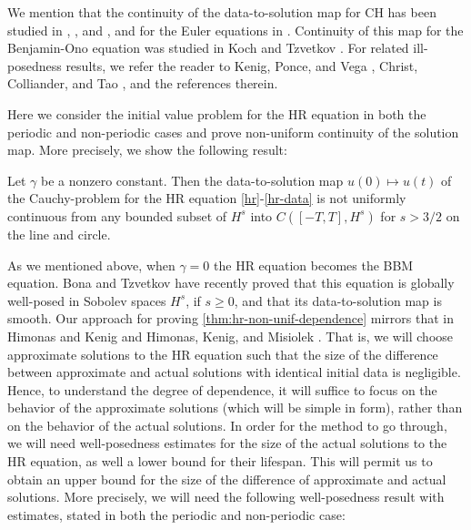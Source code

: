 We mention that the continuity of the data-to-solution map  for CH has 
been studied in  \cite{Himonas_2007_Non-uniform-con},
\cite{Himonas_2001_The-Cauchy-prob}, and 
\cite{Himonas:2005kx}, and for the Euler equations in 
\cite{Himonas_2009_Non-uniform-dep-euler}. Continuity of this map for  
the  Benjamin-Ono equation was studied in  Koch and  Tzvetkov 
\cite{Koch_2005_Nonlinear-wave-}. For related ill-posedness results, we 
refer the reader to Kenig, Ponce, and  Vega 
\cite{Kenig_2001_On-the-ill-pose}, Christ, Colliander, and Tao 
\cite{Christ_2003_Asymptotics-fre}, and the references 
therein.

Here we consider the initial value problem for the HR equation
in both the periodic and non-periodic cases
and prove non-uniform  continuity of the solution map. 
More precisely, we show the following result:
%
%
%
%
%
%
\begin{theorem}
\label{thm:hr-non-unif-dependence}
Let $\gamma$ be a nonzero constant. Then 
the data-to-solution map $u(0) \mapsto u(t)$ of the Cauchy-problem
for the HR equation
\eqref{hr}-\eqref{hr-data}
is not uniformly continuous
from any bounded subset of  $H^s$ into $C([-T, T], H^s)$
for $s>3/2$ on the line and circle.
%
\end{theorem}
%
%
%
As we mentioned above, when  $\gamma=0$ the HR equation
becomes the BBM equation.
Bona and Tzvetkov \cite{Bona_2009_Sharp-well-pose} have recently proved  that this equation  
is globally well-posed in  Sobolev spaces $H^s$, if $s \ge 0$,
and that its data-to-solution map is smooth.
%
%
%
Our approach  for proving \cref{thm:hr-non-unif-dependence}  
mirrors  that in Himonas and Kenig \cite{Himonas:2009fk} and 
Himonas, Kenig, and Misiolek \cite{Himonas_2009_Non-uniform-dep-per}.
That is, we will choose 
approximate solutions to the HR equation such that the size of the difference between approximate and actual solutions with 
identical initial data is negligible. Hence, to understand the degree of 
dependence, it will suffice to focus on the behavior of the approximate 
solutions (which will be simple in form), rather than on the behavior of the 
actual solutions. In order for the method to go through, we will 
need well-posedness estimates for  the size of the 
actual solutions to the HR equation, as well a 
lower bound for their lifespan. This will permit us to obtain an upper 
bound for the size of the difference of approximate and actual solutions. 
More precisely, we will need the following well-posedness result  with estimates,  
stated in both the  periodic and non-periodic case:


